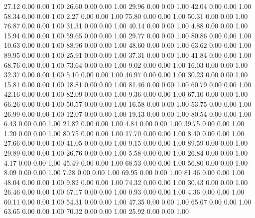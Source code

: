    27.12   0.00   0.00   1.00
   26.60   0.00   0.00   1.00
   29.96   0.00   0.00   1.00
   42.04   0.00   0.00   1.00
   58.34   0.00   0.00   1.00
    2.27   0.00   0.00   1.00
   75.80   0.00   0.00   1.00
   50.31   0.00   0.00   1.00
   76.87   0.00   0.00   1.00
   31.31   0.00   0.00   1.00
   40.14   0.00   0.00   1.00
    4.88   0.00   0.00   1.00
   15.94   0.00   0.00   1.00
   59.65   0.00   0.00   1.00
   29.77   0.00   0.00   1.00
   80.86   0.00   0.00   1.00
   10.63   0.00   0.00   1.00
   88.96   0.00   0.00   1.00
   48.60   0.00   0.00   1.00
   63.62   0.00   0.00   1.00
   89.95   0.00   0.00   1.00
   25.91   0.00   0.00   1.00
   37.31   0.00   0.00   1.00
   41.84   0.00   0.00   1.00
   68.76   0.00   0.00   1.00
   73.64   0.00   0.00   1.00
    9.02   0.00   0.00   1.00
   16.03   0.00   0.00   1.00
   32.37   0.00   0.00   1.00
    5.10   0.00   0.00   1.00
   46.97   0.00   0.00   1.00
   30.23   0.00   0.00   1.00
   15.81   0.00   0.00   1.00
   18.81   0.00   0.00   1.00
   81.46   0.00   0.00   1.00
   60.79   0.00   0.00   1.00
   42.16   0.00   0.00   1.00
   82.09   0.00   0.00   1.00
    9.36   0.00   0.00   1.00
   67.10   0.00   0.00   1.00
   66.26   0.00   0.00   1.00
   50.57   0.00   0.00   1.00
   16.58   0.00   0.00   1.00
   53.75   0.00   0.00   1.00
   26.99   0.00   0.00   1.00
   12.07   0.00   0.00   1.00
   19.13   0.00   0.00   1.00
   80.54   0.00   0.00   1.00
    6.43   0.00   0.00   1.00
   21.82   0.00   0.00   1.00
    4.84   0.00   0.00   1.00
   39.75   0.00   0.00   1.00
    1.20   0.00   0.00   1.00
   80.75   0.00   0.00   1.00
   17.70   0.00   0.00   1.00
    8.40   0.00   0.00   1.00
   27.66   0.00   0.00   1.00
   41.05   0.00   0.00   1.00
    9.15   0.00   0.00   1.00
   89.59   0.00   0.00   1.00
   29.89   0.00   0.00   1.00
   26.76   0.00   0.00   1.00
    5.58   0.00   0.00   1.00
   26.84   0.00   0.00   1.00
    4.17   0.00   0.00   1.00
   45.49   0.00   0.00   1.00
   68.53   0.00   0.00   1.00
   56.80   0.00   0.00   1.00
    8.09   0.00   0.00   1.00
    7.28   0.00   0.00   1.00
   69.95   0.00   0.00   1.00
   81.46   0.00   0.00   1.00
   48.04   0.00   0.00   1.00
    9.82   0.00   0.00   1.00
   74.32   0.00   0.00   1.00
   30.43   0.00   0.00   1.00
   26.46   0.00   0.00   1.00
   67.17   0.00   0.00   1.00
    0.93   0.00   0.00   1.00
    4.36   0.00   0.00   1.00
   60.11   0.00   0.00   1.00
   54.31   0.00   0.00   1.00
   47.35   0.00   0.00   1.00
   65.67   0.00   0.00   1.00
   63.65   0.00   0.00   1.00
   70.32   0.00   0.00   1.00
   25.92   0.00   0.00   1.00
